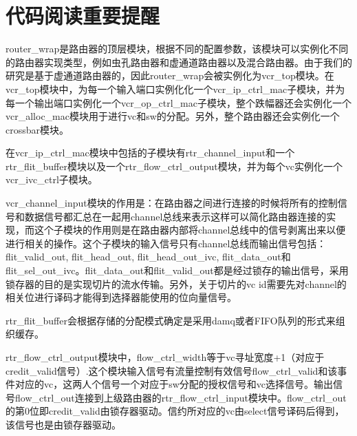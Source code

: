 ﻿\documentclass[10pt,journal]{IEEEtran}
\begin{document}
\section{代码阅读重要提醒}
router\_wrap是路由器的顶层模块，根据不同的配置参数，该模块可以实例化不同的路由器实现类型，例如虫孔路由器和虚通道路由器以及混合路由器。由于我们的研究是基于虚通道路由器的，因此router\_wrap会被实例化为vcr\_top模块。在vcr\_top模块中，为每一个输入端口实例化化一个vcr\_ip\_ctrl\_mac子模块，并为每一个输出端口实例化一个vcr\_op\_ctrl\_mac子模块，整个跌幅器还会实例化一个vcr\_alloc\_mac模块用于进行vc和sw的分配。另外，整个路由器还会实例化一个crossbar模块。

在vcr\_ip\_ctrl\_mac模块中包括的子模块有rtr\_channel\_input和一个rtr\_flit\_buffer模块以及一个rtr\_flow\_ctrl\_output模块，并为每个vc实例化一个vcr\_ivc\_ctrl子模块。

vcr\_channel\_input模块的作用是：在路由器之间进行连接的时候将所有的控制信号和数据信号都汇总在一起用channel总线来表示这样可以简化路由器连接的实现，而这个子模块的作用则是在路由器内部将channel总线中的信号剥离出来以便进行相关的操作。这个子模块的输入信号只有channel总线而输出信号包括：flit\_valid\_out, flit\_head\_out, flit\_head\_out\_ivc, flit\_data\_out和flit\_sel\_out\_ivc。flit\_data\_out和flit\_valid\_out都是经过锁存的输出信号，采用锁存器的目的是实现切片的流水传输。另外，关于切片的vc id需要先对channel的相关位进行译码才能得到选择器能使用的位向量信号。

rtr\_flit\_buffer会根据存储的分配模式确定是采用damq或者FIFO队列的形式来组织缓存。

rtr\_flow\_ctrl\_output模块中，flow\_ctrl\_width等于vc寻址宽度+1（对应于credit\_valid信号）.这个模块输入信号有流量控制有效信号flow\_ctrl\_valid和该事件对应的vc，这两人个信号一个对应于sw分配的授权信号和vc选择信号。输出信号flow\_ctrl\_out连接到上级路由器的rtr\_flow\_ctrl\_input模块中。flow\_ctrl\_out的第0位即credit\_valid由锁存器驱动。信约所对应的vc由select信号译码后得到，该信号也是由锁存器驱动。
\end{document}
